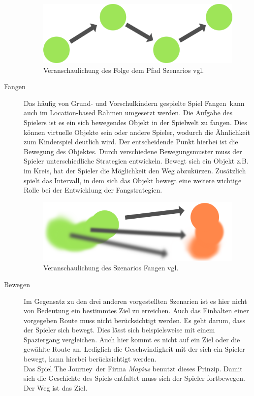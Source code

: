 \begin{description}
\begin{figure}[H]
    \centering
    \includegraphics[width=.8\textwidth]{files/lbgArten/followThePath}
    \caption{Veranschaulichung des Folge dem Pfad Szenarios vgl. \cite[S. 2]{Lehmann:2012va}}
    \label{szenB}
\end{figure}


\item[Fangen] 
\label{sec:szenarioFangen}
Das häufig von Grund- und Vorschulkindern gespielte Spiel \glqq Fangen\grqq\ kann auch im Location-based Rahmen umgesetzt werden. Die Aufgabe des Spielers ist es ein sich bewegendes Objekt in der Spielwelt zu fangen. Dies können virtuelle Objekte sein oder andere Spieler, wodurch die Ähnlichkeit zum Kinderspiel deutlich wird. Der entscheidende Punkt hierbei ist die Bewegung des Objektes. Durch verschiedene Bewegungsmuster muss der Spieler unterschiedliche Strategien entwickeln. Bewegt sich ein Objekt z.B. im Kreis, hat der Spieler die Möglichkeit den Weg abzukürzen. Zusätzlich spielt das Intervall, in dem sich das Objekt bewegt eine weitere wichtige Rolle bei der Entwicklung der Fangstrategien.
\cite[S. 1 f.]{Misund:2009ge}

\begin{figure}[H]
    \centering
    \includegraphics[width=.8\textwidth]{files/lbgArten/chaseAndCatch}
    \caption{Veranschaulichung des Szenarios Fangen vgl. \cite[S. 2]{Lehmann:2012va}}
\end{figure}

\item[Bewegen]
\label{sec:szenarioPosition}
Im Gegensatz zu den drei anderen vorgestellten Szenarien ist es hier nicht von Bedeutung ein bestimmtes Ziel zu erreichen. Auch das Einhalten einer vorgegeben Route muss nicht berücksichtigt werden. Es geht darum, dass der Spieler sich bewegt. Dies lässt sich beispielsweise mit einem Spaziergang vergleichen. Auch hier kommt es nicht auf ein Ziel oder die gewählte Route an. Lediglich die Geschwindigkeit mit der sich ein Spieler bewegt, kann hierbei berücksichtigt werden. \\
Das Spiel \glqq The Journey\grqq\ der Firma \textit{Mopius} benutzt dieses Prinzip. Damit sich die Geschichte des Spiels entfaltet muss sich der Spieler fortbewegen. Der Weg ist das Ziel.
\cite{mopius:PZPdJF8n}


\end{description}
